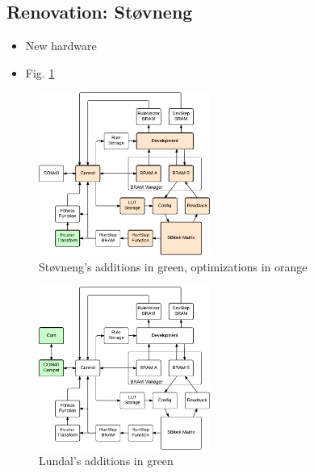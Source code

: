 \subsection{Renovation: Støvneng \cite{stovneng2014sblock}}

\begin{itemize}
    \item New hardware
    \item Fig. \ref{fig:overview-stovneng}
\end{itemize}

\begin{figure}[!ht]
    \centering
    \includegraphics[width=0.5\textwidth]{figures/overview-stovneng}
    \caption{Støvneng's additions in green, optimizations in orange}
    \label{fig:overview-stovneng}
\end{figure}

\begin{figure}[!ht]
    \centering
    \includegraphics[width=0.5\textwidth]{figures/overview-lundal}
    \caption{Lundal's additions in green}
    \label{fig:overview-lundal}
\end{figure}

